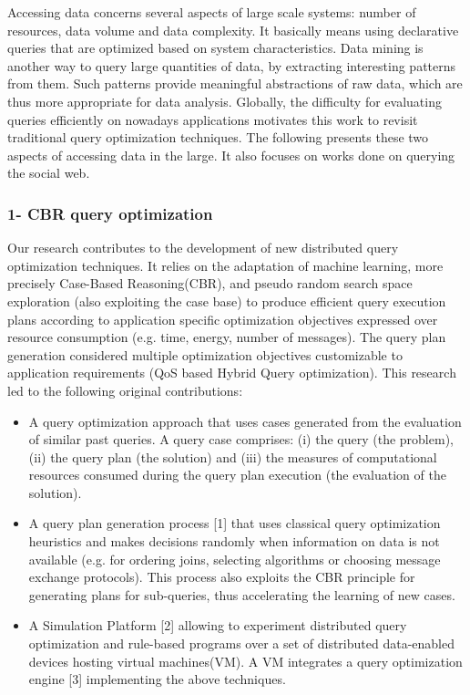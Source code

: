 Accessing data concerns several aspects of large scale systems: number of resources, data volume and data complexity. It basically means using declarative queries that are optimized based on system characteristics.
Data mining is another way to query large quantities of data, by extracting interesting patterns from them. Such patterns provide meaningful abstractions of raw data, which are thus more appropriate for data analysis. 
Globally, the difficulty for evaluating queries efficiently on nowadays applications motivates this work to revisit traditional query optimization techniques. The following presents these two aspects of accessing data in the large. It also focuses on works done on querying the social web. 

\subsubsection*{1- CBR query optimization}

Our research contributes to the development of new distributed query optimization techniques. It relies on the adaptation of machine learning, more precisely Case-Based Reasoning(CBR), and pseudo random search space exploration (also exploiting the case base) to produce efficient  query execution plans according to application specific optimization objectives expressed over resource consumption (e.g. time, energy, number of messages).  The query plan generation considered multiple optimization objectives customizable to application requirements (QoS based Hybrid Query optimization).
This research led to the following original contributions:
\begin{itemize}
\item  A query optimization approach that uses cases generated from the evaluation of similar past queries. A query case comprises: (i) the query (the problem), (ii) the query plan (the solution) and (iii) the measures of computational resources consumed during the query plan execution (the evaluation of the solution). 

\item  A query plan generation process [1] that uses classical query optimization heuristics and makes decisions randomly when information on data is not available (e.g. for ordering joins, selecting algorithms or choosing message exchange protocols). This process also exploits the CBR principle for generating plans for sub-queries, thus accelerating the learning of new cases. 

\item  A Simulation Platform [2] allowing to experiment distributed query optimization and rule-based programs over a set of distributed data-enabled devices hosting virtual machines(VM). A VM integrates a query optimization engine [3] implementing the above techniques. 
\end{itemize}

